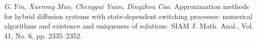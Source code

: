 
\begin{thebibliography}{wlab}

\emph{G.\,Yin, Xuerong Mao, Chenggui Yuan, Dingzhou Cao}.
\newblock Approximation methods for hybrid diffusion systems with state-dependent switching processes: numerical algorithms and existence and uniqueness of solutions.
\newblock SIAM J. Math. Anal., Vol. 41, No. 6, pp. 2335--2352.

\end{thebibliography}

